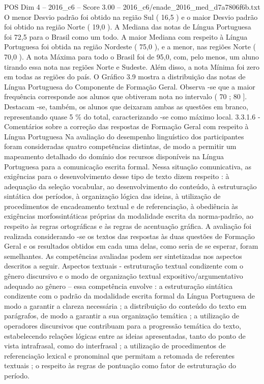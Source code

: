 \begin{textsample}{POS Dim 4 – 2016\_c6 – Score 3.00 – 2016\_c6/enade\_2016\_med\_d7a7806f6b.txt}
O menor Desvio padrão foi obtido na região Sul ( 16,5 ) e o maior Desvio padrão foi obtido na região Norte ( 19,0 ).
A Mediana das notas de Língua Portuguesa foi 72,5 para o Brasil como um todo.
A maior Mediana com respeito à Língua Portuguesa foi obtida na região Nordeste ( 75,0 ), e a menor, nas regiões Norte ( 70,0 ).
A nota Máxima para todo o Brasil foi de 95,0, com, pelo menos, um aluno tirando essa nota nas regiões Norte e Sudeste.
Além disso, a nota Mínima foi zero em todas as regiões do país.
O Gráfico 3.9 mostra a distribuição das notas de Língua Portuguesa do Componente de Formação Geral.
Observa -se que a maior frequência corresponde aos alunos que obtiveram nota no intervalo ( 70 ; 80 ].
Destacam -se, também, os alunos que deixaram ambas as questões em branco, representando quase 5 \% do total, caracterizando -se como máximo local. 3.3.1.6 - Comentários sobre a correção das respostas de Formação Geral com respeito à Língua Portuguesa Na avaliação do desempenho linguístico dos participantes foram consideradas quatro competências distintas, de modo a permitir um mapeamento detalhado do domínio dos recursos disponíveis na Língua Portuguesa para a comunicação escrita formal.
Nessa situação comunicativa, as exigências para o desenvolvimento desse tipo de texto dizem respeito : à adequação da seleção vocabular, ao desenvolvimento do conteúdo, à estruturação sintática dos períodos, à organização lógica das ideias, à utilização de procedimentos de encadeamento textual e de referenciação, à obediência às exigências morfossintáticas próprias da modalidade escrita da norma-padrão, ao respeito às regras ortográficas e às regras de acentuação gráfica.
A avaliação foi realizada considerando -se os textos das respostas às duas questões de Formação Geral e os resultados obtidos em cada uma delas, como seria de se esperar, foram semelhantes.
As competências avaliadas podem ser sintetizadas nos aspectos descritos a seguir.
Aspectos textuais - estruturação textual condizente com o gênero discursivo e o modo de organização textual expositivo/argumentativo adequado ao gênero – essa competência envolve : a estruturação sintática condizente com o padrão da modalidade escrita formal da Língua Portuguesa de modo a garantir a clareza necessária ; a distribuição do conteúdo do texto em parágrafos, de modo a garantir a sua organização temática ; a utilização de operadores discursivos que contribuam para a progressão temática do texto, estabelecendo relações lógicas entre as ideias apresentadas, tanto do ponto de vista intrafrasal, como do interfrasal ; a utilização de procedimentos de referenciação lexical e pronominal que permitam a retomada de referentes textuais ; o respeito às regras de pontuação como fator de estruturação do período.

\end{textsample}
